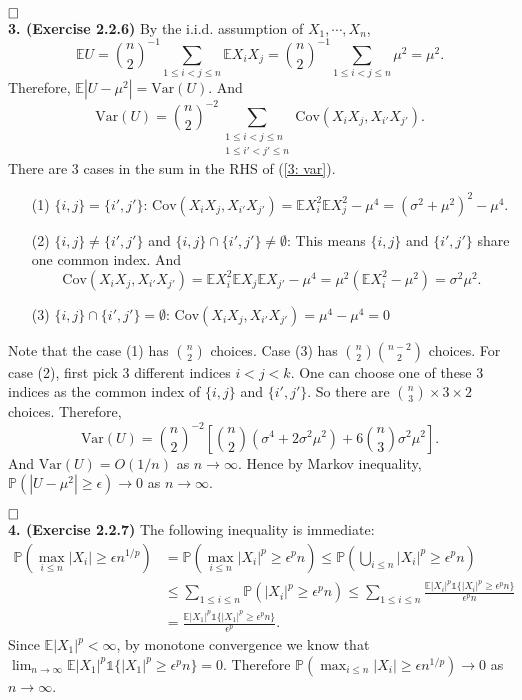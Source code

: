 \documentclass[12pt]{extarticle}
\begin{document}
$\hspace{\fill}\square$
\\
\textbf{3. (Exercise 2.2.6)}
By the i.i.d. assumption of $X_1,\cdots,X_n$,
\[
\mathbb{E}U=\binom{n}{2}^{-1}\sum_{1\leq i<j\leq n}\mathbb{E}X_iX_j=\binom{n}{2}^{-1}\sum_{1\leq i<j\leq n}\mu^2=\mu^2.
\]
Therefore, $\mathbb{E}|U-\mu^2|=\text{Var}(U)$.
And
\begin{equation}
\text{Var}(U)=\binom{n}{2}^{-2}\sum_{\substack{1\leq i<j\leq n\\1\leq i'<j'\leq n}}\text{Cov}(X_iX_j,X_{i'}X_{j'}).
\label{3: var}
\end{equation}
There are 3 cases in the sum in the RHS of (\ref{3: var}).
\begin{enumerate}
\item[(1)] $\{i,j\}=\{i',j'\}$: $\text{Cov}(X_iX_j,X_{i'}X_{j'})=\mathbb{E}X_i^2\mathbb{E}X_j^2-\mu^4=(\sigma^2+\mu^2)^2-\mu^4$.
\item[(2)] $\{i,j\}\neq\{i',j'\}$ and $\{i,j\}\cap\{i',j'\}\neq\emptyset$:
This means $\{i,j\}$ and $\{i',j'\}$ share one common index. And
\[
\text{Cov}(X_iX_j,X_{i'}X_{j'})=\mathbb{E}X_i^2\mathbb{E}X_j\mathbb{E}X_{j'}-\mu^4=\mu^2(\mathbb{E}X_i^2-\mu^2)
=
\sigma^2\mu^2.
\]
\item[(3)] $\{i,j\}\cap\{i',j'\}=\emptyset$:
$\text{Cov}(X_iX_j,X_{i'}X_{j'})=\mu^4-\mu^4=0$
\end{enumerate}
Note that the case (1) has $\binom{n}{2}$ choices.
Case (3) has $\binom{n}{2}\binom{n-2}{2}$ choices.
For case (2),
first pick 3 different indices $i<j<k$. One can choose one of these 3 indices as the common index of $\{i,j\}$ and $\{i',j'\}$.
So there are $\binom{n}{3}\times 3\times 2$ choices.
Therefore,
\[
\text{Var}(U)=\binom{n}{2}^{-2}\left[
\binom{n}{2}(\sigma^4+2\sigma^2\mu^2)+6\binom{n}{3}\sigma^2\mu^2
\right].
\]
And $\text{Var}(U)=O(1/n)$ as $n\rightarrow\infty$.
Hence by Markov inequality,
$\mathbb{P}(|U-\mu^2|\geq\epsilon)\rightarrow 0$ as $n\rightarrow\infty$.

$\hspace{\fill}\square$
\\
\textbf{4. (Exercise 2.2.7)}
The following inequality is immediate:
\[
\begin{aligned}
\mathbb{P}(\max_{i\leq n}|X_i|\geq\epsilon n^{1/p})
&=
\mathbb{P}(\max_{i\leq n}|X_i|^p\geq\epsilon^pn)
\leq
\mathbb{P}\left(\bigcup_{i\leq n}|X_i|^p\geq \epsilon^p n\right)
\\&\leq
\sum_{1\leq i\leq n}\mathbb{P}(|X_i|^p\geq\epsilon^pn)
\leq
\sum_{1\leq i\leq n}\frac{\mathbb{E}|X_i|^p\mathds{1}\{|X_i|^p\geq\epsilon^pn\}}{\epsilon^pn}
\\&=
\frac{\mathbb{E}|X_1|^p\mathds{1}\{|X_1|^p\geq\epsilon^pn\}}{\epsilon^p}.
\end{aligned}
\]
Since $\mathbb{E}|X_1|^p<\infty$, by monotone convergence we know that $\lim_{n\rightarrow\infty}\mathbb{E}|X_1|^p\mathds{1}\{|X_1|^p\geq\epsilon^pn\}=0$.
Therefore $\mathbb{P}(\max_{i\leq n}|X_i|\geq\epsilon n^{1/p})\rightarrow 0$ as $n\rightarrow\infty$.
\end{document}
